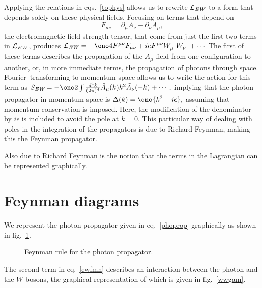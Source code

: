 Applying the relations in eqs.~\eqref{tophys} allows us to rewrite $\mathcal{L}_{\text{\emph{EW}}}$ to a form that depends solely on these physical fields. Focusing on terms that depend on
\[F_{\mu\nu}=\partial_\mu A_\nu - \partial_\nu A_\mu,\]
the electromagnetic field strength tensor, that come from just the first two terms in $\mathcal{L}_{\text{\emph{EW}}}$, produces
\(\mathcal{L}_{\text{\emph{EW}}}=-\ono4 F^{\mu\nu}F_{\mu\nu}+ie F^{\mu\nu}W^{+}_\mu W^{-}_\nu+\cdots\label{ewfmn}\)
The first of these terms describes the propagation of the $A_\mu$ field from one configuration to another, or, in more immediate terms, the propagation of photons through space. Fourier--transforming to momentum space allows us to write the action for this term as
\(S_{\textit{EW}}=-\ono2\int\frac{d^4k}{(2\pi)^4}\tilde A_\mu(k)k^2\tilde A_\nu(-k)+\cdots,\)
implying that the photon propagator in momentum space is
\(\Delta(k)=\ono{k^2-i\epsilon},\label{phoprop}\)
assuming that momentum conservation is imposed. Here, the modification of the denominator by $i\epsilon$ is included to avoid the pole at $k=0$. This particular way of dealing with poles in the integration of the propagators is due to Richard Feynman, making this the Feynman propagator.

Also due to Richard Feynman is the notion that the terms in the Lagrangian can be represented graphically.

\section{Feynman diagrams}
We represent the photon propagator given in eq.~\eqref{phoprop} graphically as shown in fig.~\ref{phoprop}.

\begin{figure}[hbtp]
\begin{minipage}[c]{.69\textwidth}\centering\footnotesize
{}
\end{minipage}\hfill
\begin{minipage}[c]{.3\textwidth}
\caption{Feynman rule for the photon propagator.}
\label{phoprop}
\end{minipage}
\end{figure}

The second term in eq.~\eqref{ewfmn} describes an interaction between the photon and the $W$ bosons, the graphical representation of which is given in fig.~\ref{wwgam}.

